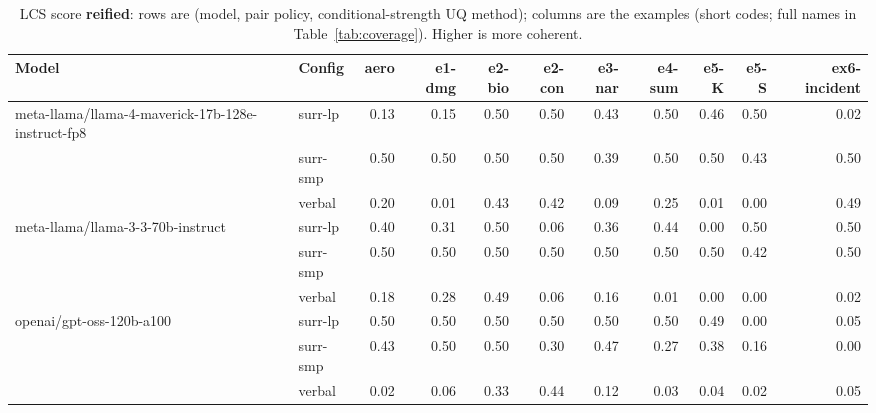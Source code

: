 \documentclass[11pt]{article}
\begin{document}
\begin{table}[htbp]
\centering
\footnotesize
\setlength{\tabcolsep}{3.5pt}
\caption{LCS score \textbf{reified}: rows are (model, pair policy, conditional-strength UQ method); columns are the examples (short codes; full names in Table~\ref{tab:coverage}). Higher is more coherent.}
\label{tab:reified}
\begin{tabular}{llrrrrrrrrr}
\toprule
\textbf{Model} & \textbf{Config} & \textbf{aero} & \textbf{e1-dmg} & \textbf{e2-bio} & \textbf{e2-con} & \textbf{e3-nar} & \textbf{e4-sum} & \textbf{e5-K} & \textbf{e5-S} & \textbf{ex6-incident} \\
\midrule
meta-llama/llama-4-maverick-17b-128e-instruct-fp8 & surr-lp & 0.13 & 0.15 & 0.50 & 0.50 & 0.43 & 0.50 & 0.46 & 0.50 & 0.02 \\
 & surr-smp & 0.50 & 0.50 & 0.50 & 0.50 & 0.39 & 0.50 & 0.50 & 0.43 & 0.50 \\
 & verbal & 0.20 & 0.01 & 0.43 & 0.42 & 0.09 & 0.25 & 0.01 & 0.00 & 0.49 \\
\midrule
meta-llama/llama-3-3-70b-instruct & surr-lp & 0.40 & 0.31 & 0.50 & 0.06 & 0.36 & 0.44 & 0.00 & 0.50 & 0.50 \\
 & surr-smp & 0.50 & 0.50 & 0.50 & 0.50 & 0.50 & 0.50 & 0.50 & 0.42 & 0.50 \\
 & verbal & 0.18 & 0.28 & 0.49 & 0.06 & 0.16 & 0.01 & 0.00 & 0.00 & 0.02 \\
\midrule
openai/gpt-oss-120b-a100 & surr-lp & 0.50 & 0.50 & 0.50 & 0.50 & 0.50 & 0.50 & 0.49 & 0.00 & 0.05 \\
 & surr-smp & 0.43 & 0.50 & 0.50 & 0.30 & 0.47 & 0.27 & 0.38 & 0.16 & 0.00 \\
 & verbal & 0.02 & 0.06 & 0.33 & 0.44 & 0.12 & 0.03 & 0.04 & 0.02 & 0.05 \\
\bottomrule
\end{tabular}
\end{table}
\end{document}
